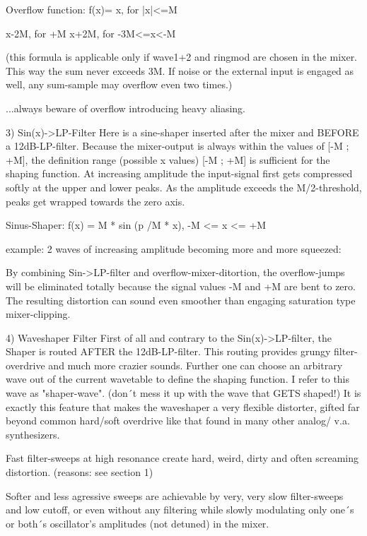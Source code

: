 Overflow function: f(x)= {x, for |x|<=M}
{x-2M, for +M {x+2M, for -3M<=x<-M}
	
	(this formula is applicable only if wave1+2 and ringmod are chosen in the mixer. This way the sum never exceeds 3M. If noise or the external input is engaged as well, any sum-sample may overflow even two times.)
	
	
	
	...always beware of overflow introducing heavy aliasing.
	
	3) Sin(x)->LP-Filter
	Here is a sine-shaper inserted after the mixer and BEFORE a 12dB-LP-filter. Because the mixer-output is always within the values of [-M ; +M], the definition range (possible x values) [-M ; +M] is sufficient for the shaping function. At increasing amplitude the input-signal first gets compressed softly at the upper and lower peaks. As the amplitude exceeds the M/2-threshold, peaks get wrapped towards the zero axis.
	
	Sinus-Shaper: f(x) = M * sin (p /M * x), -M <= x <= +M
	
	
	
	
	
	example: 2 waves of increasing amplitude becoming more and more squeezed:
	
	
	
	
	
	
	
	By combining Sin->LP-filter and overflow-mixer-ditortion, the overflow-jumps will be eliminated totally because the signal values -M and +M are bent to zero. The resulting distortion can sound even smoother than engaging saturation type mixer-clipping.
	
	4) Waveshaper Filter
	First of all and contrary to the Sin(x)->LP-filter, the Shaper is routed AFTER the 12dB-LP-filter. This routing provides grungy filter-overdrive and much more crazier sounds. Further one can choose an arbitrary wave out of the current wavetable to define the shaping function. I refer to this wave as "shaper-wave". (don´t mess it up with the wave that GETS shaped!) It is exactly this feature that makes the waveshaper a very flexible distorter, gifted far beyond common hard/soft overdrive like that found in many other analog/ v.a. synthesizers.
	
	Fast filter-sweeps at high resonance create hard, weird, dirty and often screaming distortion. (reasons: see section 1)
	
	Softer and less agressive sweeps are achievable by very, very slow filter-sweeps and low cutoff, or even without any filtering while slowly modulating only one´s or both´s oscillator's amplitudes (not detuned) in the mixer.
	
}
